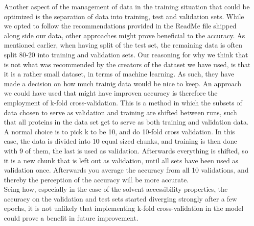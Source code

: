   Another aspect of the management of data in the training situation that could be optimized is the separation of data into training, test and validation sets. While we opted to follow the recommendations provided in the ReadMe file shipped along side our data, other approaches might prove beneficial to the accuracy. As mentioned earlier, when having split of the test set, the remaining data is often split 80-20 into training and validation sets. Our reasoning for why we think that is not what was recommended by the creators of the dataset we have used, is that it is a rather small dataset, in terms of machine learning. As such, they have made a decision on how much trainig data would be nice to keep. An approach we could have used that might have improven accuracy is therefore the employment of k-fold cross-validation. This is a method in which the subsets of data chosen to serve as validation and training are shifted between runs, such that all proteins in the data set get to serve as both training and validation data. A normal choice is to pick k to be 10, and do 10-fold cross validation. In this case, the data is divided into 10 equal sized chunks, and training is then done with 9 of them, the last is used as validation. Afterwards everything is shifted, so it is a new chunk that is left out as validation, until all sets have been used as validation once. Afterwards you average the accuracy from all 10 validations, and thereby the perception of the accuracy will be more accurate.\\ Seing how, especially in the case of the solvent accessibility properties, the accuracy on the validation and test sets started diverging strongly after a few epochs, it is not unlikely that implementing k-fold cross-validation in the model could prove a benefit in future improvement. 

